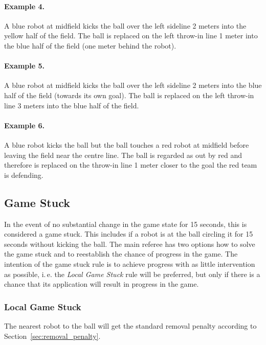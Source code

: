 \documentclass[12pt]{article}
\newcommand{\ie}{\mbox{i.\,e.}\xspace}
\begin{document}
\paragraph{Example 4.} A blue robot at midfield kicks the ball over the left sideline 2 meters into the yellow half of the field. The ball is replaced on the left throw-in line 1 meter into the blue half of the field (one meter behind the robot).

\paragraph{Example 5.} A blue robot at midfield kicks the ball over the left sideline 2 meters into the blue half of the field (towards its own goal). The ball is replaced on the left throw-in line 3 meters into the blue half of the field.

\paragraph{Example 6.} A blue robot kicks the ball but the ball touches a red robot at midfield before leaving the field near the centre line. The ball is regarded as out by red and therefore is replaced on the throw-in line 1 meter closer to the goal the red team is defending.


\subsection{Game Stuck}
\label{sec:game_stuck}

In the event of no substantial change in the game state for 15 seconds, this is considered a game stuck. 
This includes if a robot is at the ball circling it for 15 seconds without kicking the ball.
The main referee has two options how to solve the game stuck and to reestablish the chance of progress in the game. The intention of the game stuck rule is to achieve progress with as little intervention as possible, \ie the \emph{Local Game Stuck} rule will be preferred, but only if there is a chance that its application will result in progress in the game.

\subsubsection{Local Game Stuck}
\label{sec:game_stuck:local}

The nearest robot to the ball will get the standard removal penalty according to Section~\ref{sec:removal_penalty}.
\end{document}
